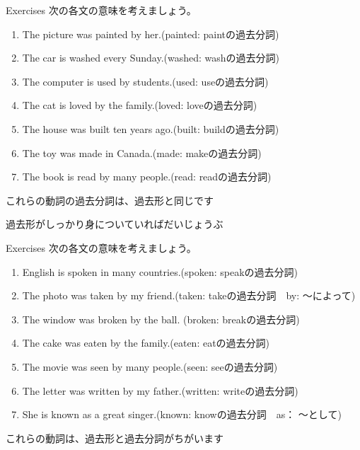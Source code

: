 \documentclass[aspectratio=169,xcolor={dvipsnames,table}]{beamer}
\begin{document}
\begin{frame}[plain]{Exercises}
 次の各文の意味を考えましょう。

\begin{enumerate}
 \item The picture was painted by her.\hfill{}(painted: paintの過去分詞)
 \item The car is washed every Sunday.\hfill{}(washed: washの過去分詞)
 \item The computer is used by students.\hfill{}(used: useの過去分詞)
 \item The cat is loved by the family.\hfill{}(loved: loveの過去分詞)
 \item The house was built ten years ago.\hfill{}(built: buildの過去分詞)
 \item The toy was made in Canada.\hfill{}(made: makeの過去分詞)
 \item The book is read by many people.\hfill{}(read: readの過去分詞)
\end{enumerate}

\pause

これらの動詞の過去分詞は、過去形と同じです

\vspace{-5pt}

過去形がしっかり身についていればだいじょうぶ
\end{frame}

\begin{frame}[plain]{Exercises}
 次の各文の意味を考えましょう。

 \begin{enumerate}
\item English is spoken in many countries.\hfill{}(spoken: speakの過去分詞)
\item The photo was taken by my friend.\hfill{}(taken: takeの過去分詞　by: 〜によって)
\item The window was broken by the ball.\hfill{} (broken: breakの過去分詞)
\item The cake was eaten by the family.\hfill{}(eaten: eatの過去分詞)
\item The movie was seen by many people.\hfill{}(seen: seeの過去分詞)
\item The letter was written by my father.\hfill{}(written: writeの過去分詞)
\item She is known as a great singer.\hfill{}(known: knowの過去分詞　as： 〜として)
\end{enumerate}

\pause

これらの動詞は、過去形と過去分詞がちがいます

\end{frame}
\end{document}
